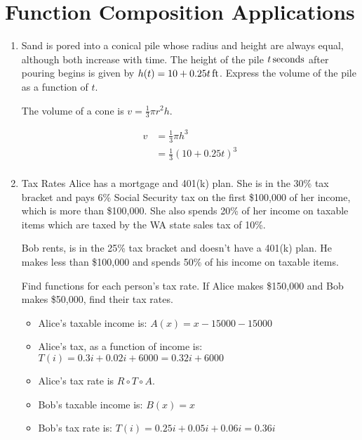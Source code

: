 \documentclass{exam}
\begin{document}
\section{Function Composition Applications}
\begin{enumerate}
  \item Sand is pored into a conical pile whose radius and height are always equal, although both increase with time.
    The height of the pile $\unit[t]{seconds}$ after pouring begins is given by $h(t) = \unit[10 + 0.25t]{ft}$.  Express the
    volume of the pile as a function of $t$.

    The volume of a cone is $v = \frac{1}{3} \pi r^2 h$.

    \begin{solution}
      \begin{align*}
         v &= \frac{1}{3} \pi h^3 \\
       &= \frac{1}{3} (10 + 0.25t)^3 \\
      \end{align*}
    \end{solution}

  \item Tax Rates
    Alice has a mortgage and 401(k) plan.  She is in the 30\% tax bracket and pays 6\% Social Security tax on the first
    \$100,000 of her income, which is more than \$100,000.  She also spends 20\% of her income on taxable items which
    are taxed by the WA state sales tax of 10\%.

    Bob rents, is in the 25\% tax bracket and doesn't have a 401(k) plan.  He makes less than \$100,000 and spends 50\%
    of his income on taxable items.

    Find functions for each person's tax rate.  If Alice makes \$150,000 and Bob makes \$50,000, find their tax rates.

    \begin{solution}
      \begin{itemize}
        \item Alice's taxable income is: $A(x) = x - 15000 - 15000$
        \item Alice's tax, as a function of income is: $T(i) = 0.3i + 0.02i + 6000 = 0.32i + 6000$
        \item Alice's tax rate is $R \circ T \circ A$.
        \item Bob's taxable income is: $B(x) = x$
        \item Bob's tax rate is: $T(i) = 0.25i + 0.05i + 0.06i = 0.36i$
      \end{itemize}


\end{solution}
\end{enumerate}
\end{document}
